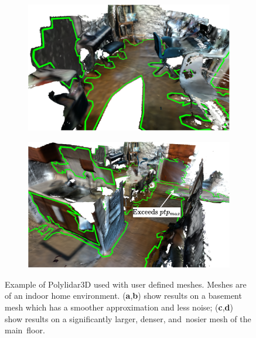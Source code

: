 \begin{figure}[!htb]
\begin{subfigure}[t]{.40\linewidth}
    \centering\includegraphics[clip,trim=0cm 0cm 0cm 0cm, width=.99\linewidth]{chapter_3_polylidar3d/imgs/meshes/mesh_polylidar3d_examples-mesh_mainfloor_two.pdf}
    \caption{\label{fig:ch3_mesh_example_c}}
  \end{subfigure}
  \hfill
  \begin{subfigure}[t]{.40\linewidth}
    \centering\includegraphics[clip,trim=0cm 0cm 0cm 0cm,width=.99\linewidth]{chapter_3_polylidar3d/imgs/meshes/mesh_polylidar3d_examples-mesh_mainfloor_one.pdf}
    \caption{\label{fig:ch3_mesh_example_d}}
  \end{subfigure}
  \caption[Example of Polylidar3D used with user defined meshes]{Example of Polylidar3D used with user defined meshes. Meshes are of an indoor home environment. (\textbf{a},\textbf{b}) show results on a basement mesh which has a smoother approximation and less noise; (\textbf{c},\textbf{d}) show results on a significantly larger, denser, and~nosier mesh of the main~floor. }\label{fig:ch3_mesh_example}
\end{figure}
\unskip

